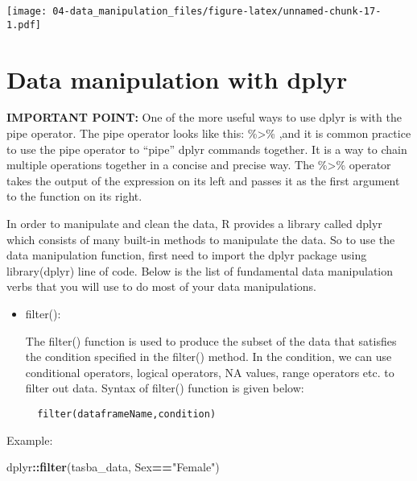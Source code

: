 \documentclass[
]{book}
\newenvironment{Shaded}{\begin{snugshade}}{\end{snugshade}}
\newcommand{\AttributeTok}[1]{\textcolor[rgb]{0.13,0.29,0.53}{#1}}
\newcommand{\FunctionTok}[1]{\textcolor[rgb]{0.13,0.29,0.53}{\textbf{#1}}}
\newcommand{\NormalTok}[1]{#1}
\newcommand{\SpecialCharTok}[1]{\textcolor[rgb]{0.81,0.36,0.00}{\textbf{#1}}}
\newcommand{\StringTok}[1]{\textcolor[rgb]{0.31,0.60,0.02}{#1}}
\begin{document}
\begin{Shaded}
\end{Shaded}

\texttt{[image: 04-data\_manipulation\_files/figure-latex/unnamed-chunk-17-1.pdf]}

\hypertarget{data-manipulation-with-dplyr}{%
\section{Data manipulation with dplyr}\label{data-manipulation-with-dplyr}}

\textbf{IMPORTANT POINT:}
One of the more useful ways to use dplyr is with the pipe operator. The pipe operator looks like this: \%\textgreater\% ,and it is common practice to use the pipe operator to ``pipe'' dplyr commands together. It is a way to chain multiple operations together in a concise and precise way. The \%\textgreater\% operator takes the output of the expression on its left and passes it as the first argument to the function on its right.

In order to manipulate and clean the data, R provides a library called dplyr which consists of many built-in methods to manipulate the data. So to use the data manipulation function, first need to import the dplyr package using library(dplyr) line of code. Below is the list of fundamental data manipulation verbs that you will use to do most of your data manipulations.

\begin{itemize}
\item
  filter():

  The filter() function is used to produce the subset of the data that satisfies the condition specified in the filter() method. In the condition, we can use conditional operators, logical operators, NA values, range operators etc. to filter out data. Syntax of filter() function is given below:

\begin{verbatim}
  filter(dataframeName,condition)
\end{verbatim}
\end{itemize}

Example:

\begin{Shaded}
\begin{Highlighting}[]
\NormalTok{dplyr}\SpecialCharTok{::}\FunctionTok{filter}\NormalTok{(tasba\_data, Sex}\SpecialCharTok{==}\StringTok{"Female"}\NormalTok{)}
\end{Highlighting}
\end{Shaded}
\end{document}
